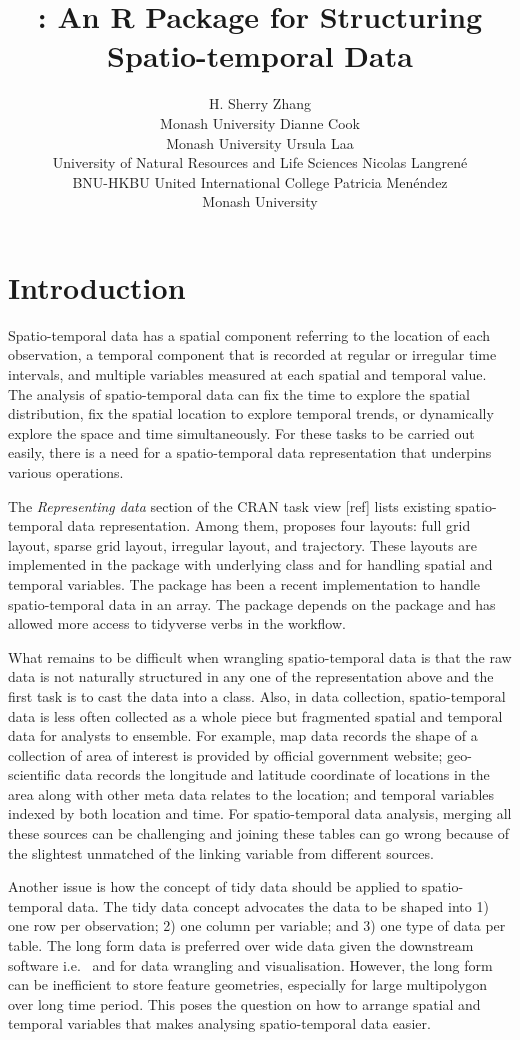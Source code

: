 \documentclass[
]{jss}
\author{
H. Sherry Zhang\\Monash University \And Dianne Cook\\Monash University \AND Ursula Laa\\University of Natural Resources and Life Sciences \AND Nicolas Langrené\\BNU-HKBU United International College \AND Patricia Menéndez\\Monash University \AND
}
\title{\pkg{cubble}: An R Package for Structuring Spatio-temporal Data}
\begin{document}
\newpage

\hypertarget{introduction}{%
\section{Introduction}\label{introduction}}

Spatio-temporal data has a spatial component referring to the location of each observation, a temporal component that is recorded at regular or irregular time intervals, and multiple variables measured at each spatial and temporal value. The analysis of spatio-temporal data can fix the time to explore the spatial distribution, fix the spatial location to explore temporal trends, or dynamically explore the space and time simultaneously. For these tasks to be carried out easily, there is a need for a spatio-temporal data representation that underpins various operations.

The \emph{Representing data} section of the CRAN task view {[}ref{]} lists existing spatio-temporal data representation. Among them, \citet{spacetime} proposes four layouts: full grid layout, sparse grid layout, irregular layout, and trajectory. These layouts are implemented in the  package with underlying class  \citep{sp} and  \citep{xts} for handling spatial and temporal variables. The  package has been a recent implementation to handle spatio-temporal data in an array. The package depends on the  package and has allowed more access to tidyverse verbs in the workflow.

What remains to be difficult when wrangling spatio-temporal data is that the raw data is not naturally structured in any one of the representation above and the first task is to cast the data into a class. Also, in data collection, spatio-temporal data is less often collected as a whole piece but fragmented spatial and temporal data for analysts to ensemble. For example, map data records the shape of a collection of area of interest is provided by official government website; geo-scientific data records the longitude and latitude coordinate of locations in the area along with other meta data relates to the location; and temporal variables indexed by both location and time. For spatio-temporal data analysis, merging all these sources can be challenging and joining these tables can go wrong because of the slightest unmatched of the linking variable from different sources.

Another issue is how the concept of tidy data \citep{tidydata} should be applied to spatio-temporal data. The tidy data concept advocates the data to be shaped into 1) one row per observation; 2) one column per variable; and 3) one type of data per table. The long form data is preferred over wide data given the downstream software i.e.~ and  for data wrangling and visualisation. However, the long form can be inefficient to store feature geometries, especially for large multipolygon over long time period. This poses the question on how to arrange spatial and temporal variables that makes analysing spatio-temporal data easier.
\end{document}
